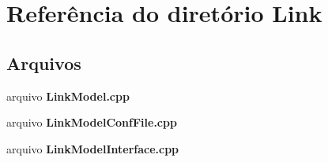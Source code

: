 \section{Referência do diretório Link}
\label{dir_84fc232112ec97fc1d6f2854fb1147e2}
\subsection*{Arquivos}
\begin{DoxyCompactItemize}
\item 
arquivo {\bf Link\+Model.\+cpp}
\item 
arquivo {\bf Link\+Model\+Conf\+File.\+cpp}
\item 
arquivo {\bf Link\+Model\+Interface.\+cpp}
\end{DoxyCompactItemize}
